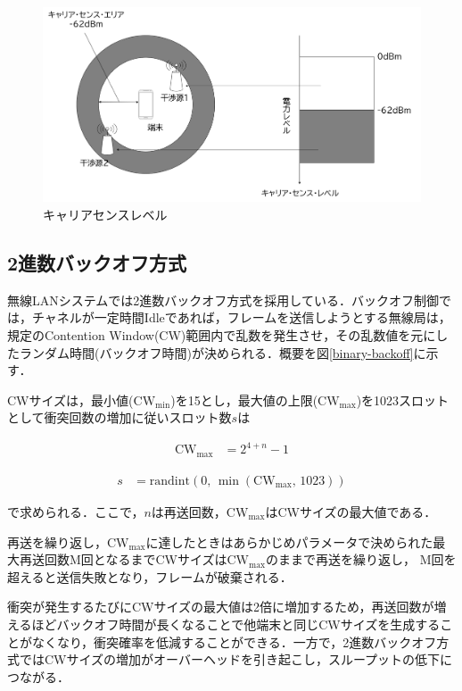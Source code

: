\documentclass[a4paper,10pt]{ltjsarticle}
\begin{document}
\begin{figure}[H]
  \centering
  \includegraphics[width=\textwidth]{./assets/CS_level.png}
  \caption{キャリアセンスレベル\cite{midori}}
  \label{fig:CS_level}
\end{figure}


\subsection{2進数バックオフ方式}

無線LANシステムでは2進数バックオフ方式を採用している．バックオフ制御では，チャネルが一定時間Idleであれば，フレームを送信しようとする無線局は，規定のContention Window(CW)範囲内で乱数を発生させ，その乱数値を元にしたランダム時間(バックオフ時間)が決められる．概要を図\ref{binary-backoff}に示す．


CWサイズは，最小値($\mathrm{CW_{min}}$)を15とし，最大値の上限($\mathrm{CW_{max}}$)を1023スロットとして衝突回数の増加に従いスロット数$s$は


\begin{align}
  \mathrm{CW}_{\max} &= 2^{4 + n} - 1
\end{align}

\begin{align}
  s &= \mathrm{randint}(0, \, \min(\mathrm{CW}_{\max}, \, 1023))
  \label{slot}
\end{align}

で求められる．ここで，$n$は再送回数，$\mathrm{CW}_{\max}$はCWサイズの最大値である．

再送を繰り返し，$\mathrm{CW_{max}}$に達したときはあらかじめパラメータで決められた最大再送回数M回となるまでCWサイズは$\mathrm{CW_{max}}$のままで再送を繰り返し，
M回を超えると送信失敗となり，フレームが破棄される．

衝突が発生するたびにCWサイズの最大値は2倍に増加するため，再送回数が増えるほどバックオフ時間が長くなることで他端末と同じCWサイズを生成することがなくなり，衝突確率を低減することができる．一方で，2進数バックオフ方式ではCWサイズの増加がオーバーヘッドを引き起こし，スループットの低下につながる．
\end{document}

